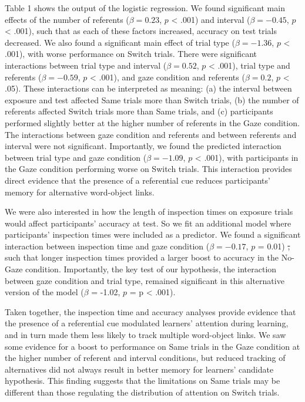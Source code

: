 \documentclass[authoryear, review]{elsarticle}
\providecommand{\DIFdeltex}[1]{{\protect\color{red}\sout{#1}}}                      %
\providecommand{\DIFdelbegin}{} %
\providecommand{\DIFdelend}{} %
\providecommand{\DIFdel}[1]{\texorpdfstring{\DIFdeltex{#1}}{}} %
\begin{document}
Table 1 shows the output of the logistic regression. We found
significant main effects of the number of referents (\(\beta = 0.23\),
\(p\) \textless{} .001) and interval (\(\beta = -0.45\), \(p\)
\textless{} .001), such that as each of these factors increased,
accuracy on test trials decreased. We also found a significant main
effect of trial type (\(\beta = -1.36\), \(p\) \textless{} .001), with
worse performance on Switch trials. There were significant interactions
between trial type and interval (\(\beta = 0.52\), \(p\) \textless{}
.001), trial type and referents (\(\beta = -0.59\), \(p\) \textless{}
.001), and gaze condition and referents (\(\beta = 0.2\), \(p\)
\textless{} .05). These interactions can be interpreted as meaning: (a)
the interval between exposure and test affected Same trials more than
Switch trials, (b) the number of referents affected Switch trials more
than Same trials, and (c) participants performed slightly better at the
higher number of referents in the Gaze condition. The interactions
between gaze condition and referents and between referents and interval
were not significant. Importantly, we found the predicted interaction
between trial type and gaze condition (\(\beta = -1.09\), \(p\)
\textless{} .001), with participants in the Gaze condition performing
worse on Switch trials. This interaction provides direct evidence that
the presence of a referential cue reduces participants' memory for
alternative word-object links.

We were also interested in how the length of inspection times on
exposure trials would affect participants' accuracy at test. So we fit
an additional model where participants' inspection times were included
as a predictor. We found a significant interaction between inspection
time and gaze condition (\(\beta = -0.17\), \(p\) = 0.01) \DIFdelbegin \DIFdel{, }\DIFdelend such that
longer inspection times provided a larger boost to accuracy in the
No-Gaze condition. Importantly, the key test of our hypothesis, the
interaction between gaze condition and trial type, remained significant
in this alternative version of the model (\(\beta\) = -1.02, \(p\) = p
\textless{} .001).

Taken together, the inspection time and accuracy analyses provide
evidence that the presence of a referential cue modulated learners'
attention during learning, and in turn made them less likely to track
multiple word-object links. We saw some evidence for a boost to
performance on Same trials in the Gaze condition at the higher number of
referent and interval conditions, but reduced tracking of alternatives
did not always result in better memory for learners' candidate
hypothesis. This finding suggests that the limitations on Same trials
may be different than those regulating the distribution of attention on
Switch trials.
\end{document}
